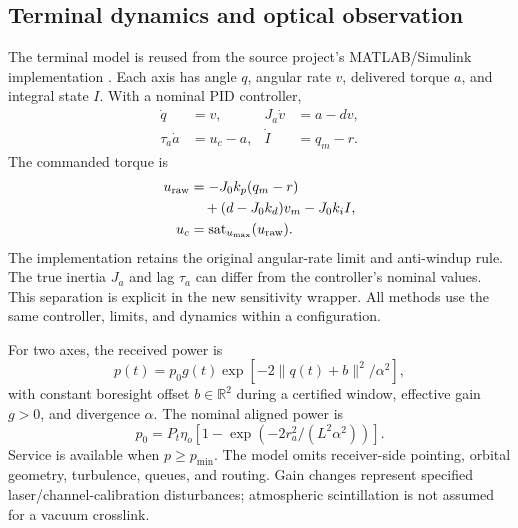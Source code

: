 \documentclass[10pt,journal]{IEEEtran}
\newcommand{\norm}[1]{\lVert#1\rVert}
\newcommand{\R}{\mathbb R}
\begin{document}
\subsection{Terminal dynamics and optical observation}
The terminal model is reused from the source project's MATLAB/Simulink implementation \cite{source}. Each axis has angle $q$, angular rate $v$, delivered torque $a$, and integral state $I$. With a nominal PID controller,
\begin{align}
 \dot q&=v, &J_a\dot v&=a-dv,\\
 \tau_a\dot a&=u_c-a, &\dot I&=q_m-r.
\end{align}
The commanded torque is
\begin{align}
 u_{\rm raw}&=-J_0k_p(q_m-r)\nonumber\\
 &\quad +(d-J_0k_d)v_m-J_0k_iI,\\
 u_c&=\operatorname{sat}_{u_{\max}}(u_{\rm raw}).
\end{align}
The implementation retains the original angular-rate limit and anti-windup rule. The true inertia $J_a$ and lag $\tau_a$ can differ from the controller's nominal values. This separation is explicit in the new sensitivity wrapper. All methods use the same controller, limits, and dynamics within a configuration.

For two axes, the received power is
\begin{equation}
 p(t)=p_0g(t)\exp\!\left[-2\norm{q(t)+b}^2/\alpha^2\right],
 \label{eq:obs}
\end{equation}
with constant boresight offset $b\in\R^2$ during a certified window, effective gain $g>0$, and divergence $\alpha$. The nominal aligned power is
\begin{equation}
 p_0=P_t\eta_o[1-\exp(-2r_a^2/(L^2\alpha^2))].
\end{equation}
Service is available when $p\geq p_{\min}$. The model omits receiver-side pointing, orbital geometry, turbulence, queues, and routing. Gain changes represent specified laser/channel-calibration disturbances; atmospheric scintillation is not assumed for a vacuum crosslink.
\end{document}

